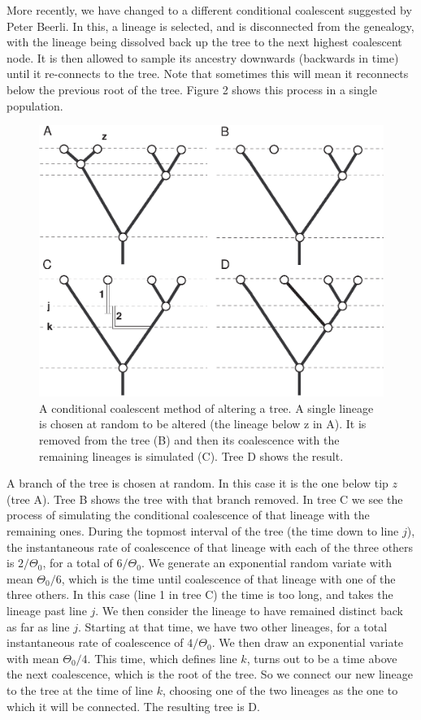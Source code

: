 More recently, we have changed to a different conditional coalescent
suggested by Peter Beerli.  In this, a lineage is selected, and is
disconnected from the genealogy, with the lineage being dissolved back up
the tree to the next highest coalescent node.  It is then allowed to
sample its ancestry downwards (backwards in time) until it re-connects
to the tree.  Note that sometimes this will mean it reconnects below the
previous root of the tree.  Figure 2 shows this process in a  single
population.
\begin{figure} %
\centerline{\includegraphics[width=4.5in]{fig2.ps}}
\caption{A conditional coalescent method of altering a tree.  A
single lineage is chosen at random to be altered (the lineage below z in
A).  It is removed from the tree (B) and then its coalescence with the
remaining lineages is simulated (C).  Tree D shows the result.
}
\end{figure}
A branch of the tree is chosen at random.  In this case it is the one below
tip $z$ (tree A).  Tree B shows the tree with that branch removed.  In
tree C we see the process of simulating the conditional coalescence of that
lineage with the remaining ones.  During the topmost interval of the tree
(the time down to line $j$), the instantaneous rate of coalescence of that
lineage with each of the three others is $2/\Theta_0$, for a total of
$6/\Theta_0$.  We generate an exponential random variate with mean $\Theta_0/6$,
which is the time until coalescence of that lineage with one of the three
others.  In this case (line 1 in tree C) the time is too long, and takes
the lineage past line $j$.  We then consider the lineage to have remained
distinct back as far as line $j$.  Starting at that time, we have two
other lineages, for a total instantaneous rate of coalescence of $4/\Theta_0$.
We then draw an exponential variate with mean $\Theta_0/4$.  This time, which
defines line $k$, turns out to be a time above the next coalescence, which
is the root of the tree.  So we connect our new lineage to the tree at the
time of line $k$, choosing one of the two lineages as the one to which it
will be connected.  The resulting tree is D.

